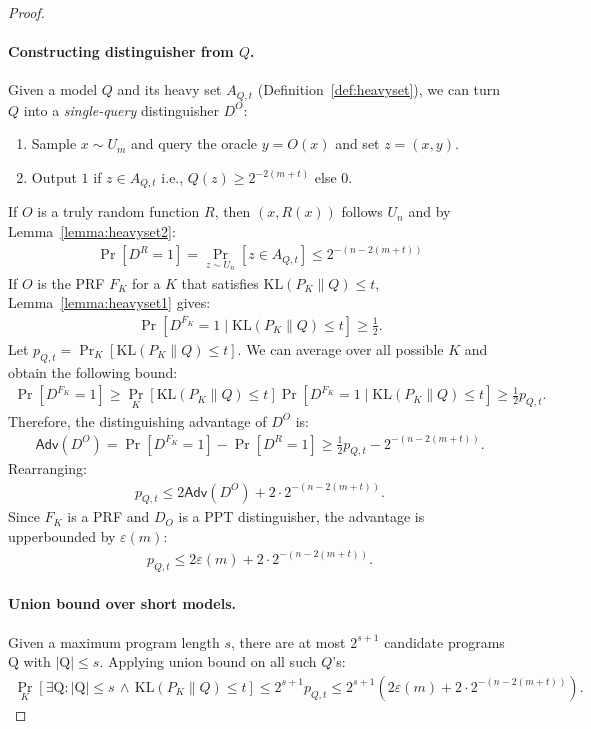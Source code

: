 \documentclass[twoside]{article}
\begin{document}
\begin{proof}
    \paragraph{Constructing distinguisher from $Q$.} Given a model $Q$ and its heavy set $A_{Q,t}$ (Definition~\ref{def:heavyset}), we can turn $Q$ into a \emph{single-query} distinguisher $D^O$:
    \begin{enumerate}
        \item Sample $x\sim U_m$ and query the oracle $y=O(x)$ and set $z = (x, y)$.
        \item Output $1$ if $z \in A_{Q,t}$ i.e., $Q(z) \geq 2^{-2(m+t)}$ else $0$.
    \end{enumerate}
    If $O$ is a truly random function $R$, then $(x, R(x))$ follows $U_n$ and by Lemma~\ref{lemma:heavyset2}:
    \begin{align}
        \Pr[D^R=1] = \Pr_{z\sim U_n}\left[z \in A_{Q,t}\right] \leq 2^{-(n-2(m+t))}
    \end{align}
    If $O$ is the PRF $F_K$ for a $K$ that satisfies $\mathrm{KL}(P_K \| Q) \leq t$, Lemma~\ref{lemma:heavyset1} gives:
    \begin{align}
        \Pr\left[D^{F_K}=1 \mid \mathrm{KL}(P_K \| Q) \leq t\right] \geq \frac{1}{2}.
    \end{align}
    Let $p_{Q, t} = \Pr_K[\mathrm{KL}(P_K \| Q) \leq t]$. We can average over all possible $K$ and obtain the following bound:
    \begin{align}
        \Pr\left[D^{F_K}=1\right] \geq \Pr_K[\mathrm{KL}(P_K \| Q) \leq t] \Pr\left[D^{F_K}=1 \mid \mathrm{KL}(P_K \| Q) \leq t\right] \geq \frac{1}{2} p_{Q, t}.
    \end{align}
    Therefore,  the distinguishing advantage of $D^O$ is:
    \begin{align}
        \mathsf{Adv}(D^O) = \Pr\left[D^{F_K}=1\right] - \Pr[D^R=1] \geq \frac{1}{2} p_{Q, t} - 2^{-(n-2(m+t))}.
    \end{align}
    Rearranging:
    \begin{align}
        p_{Q, t} \leq 2\mathsf{Adv}(D^O) + 2 \cdot 2^{-(n-2(m+t))}.
    \end{align}
    Since $F_K$ is a PRF and $D_O$ is a PPT distinguisher, the advantage is upperbounded by $\varepsilon(m)$:
    \begin{align}
        p_{Q, t} \leq 2\varepsilon(m) + 2 \cdot 2^{-(n-2(m+t))}.
    \end{align}
\paragraph{Union bound over short models.} Given a maximum program length $s$, there are at most $2^{s+1}$ candidate programs $\mathrm{Q}$ with $|\mathrm{Q}| \leq s$. Applying union bound on all such $Q$'s:
\begin{align}
    \Pr_{K}\left[\exists \mathrm{Q} : |\mathrm{Q}| \leq s \,\wedge \, \mathrm{KL}(P_K\|Q)\leq t\right]\leq 2^{s+1} p_{Q, t} \leq 2^{s+1}\left(2\varepsilon(m) + 2 \cdot 2^{-(n-2(m+t))}\right).
    \label{eq:union}
\end{align}


\end{proof}
\end{document}
